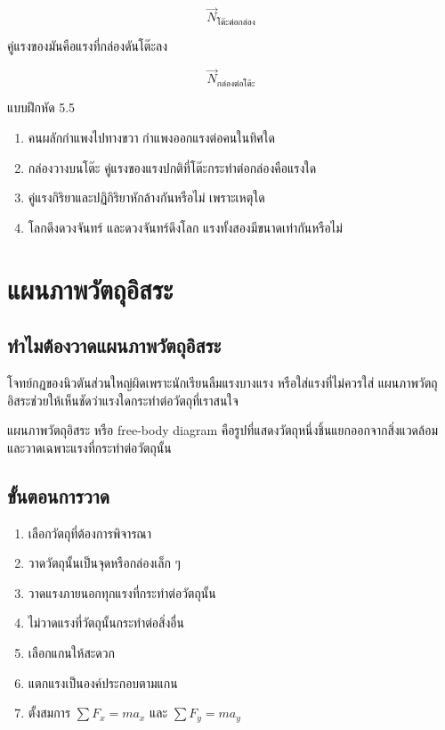 \[
\vec{N}_{\text{โต๊ะต่อกล่อง}}
\]

คู่แรงของมันคือแรงที่กล่องดันโต๊ะลง

\[
\vec{N}_{\text{กล่องต่อโต๊ะ}}
\]

\begin{exercisebox}{แบบฝึกหัด 5.5}
\begin{enumerate}
    \item คนผลักกำแพงไปทางขวา กำแพงออกแรงต่อคนในทิศใด
    \item กล่องวางบนโต๊ะ คู่แรงของแรงปกติที่โต๊ะกระทำต่อกล่องคือแรงใด
    \item คู่แรงกิริยาและปฏิกิริยาหักล้างกันหรือไม่ เพราะเหตุใด
    \item โลกดึงดวงจันทร์ และดวงจันทร์ดึงโลก แรงทั้งสองมีขนาดเท่ากันหรือไม่
\end{enumerate}
\end{exercisebox}

\section{แผนภาพวัตถุอิสระ}

\subsection{ทำไมต้องวาดแผนภาพวัตถุอิสระ}

โจทย์กฎของนิวตันส่วนใหญ่ผิดเพราะนักเรียนลืมแรงบางแรง หรือใส่แรงที่ไม่ควรใส่ แผนภาพวัตถุอิสระช่วยให้เห็นชัดว่าแรงใดกระทำต่อวัตถุที่เราสนใจ

\begin{tcolorbox}[title=นิยาม]
แผนภาพวัตถุอิสระ หรือ free-body diagram คือรูปที่แสดงวัตถุหนึ่งชิ้นแยกออกจากสิ่งแวดล้อม และวาดเฉพาะแรงที่กระทำต่อวัตถุนั้น
\end{tcolorbox}

\subsection{ขั้นตอนการวาด}

\begin{enumerate}
    \item เลือกวัตถุที่ต้องการพิจารณา
    \item วาดวัตถุนั้นเป็นจุดหรือกล่องเล็ก ๆ
    \item วาดแรงภายนอกทุกแรงที่กระทำต่อวัตถุนั้น
    \item ไม่วาดแรงที่วัตถุนั้นกระทำต่อสิ่งอื่น
    \item เลือกแกนให้สะดวก
    \item แตกแรงเป็นองค์ประกอบตามแกน
    \item ตั้งสมการ $\sum F_x=ma_x$ และ $\sum F_y=ma_y$
\end{enumerate}

